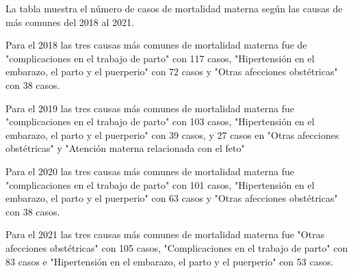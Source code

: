 La tabla muestra el número de casos de mortalidad materna según las causas de más comunes del 2018 al 2021. 

Para el 2018 las tres causas más comunes de mortalidad materna fue de  "complicaciones en el trabajo de parto" con 117 casos, "Hipertensión en el embarazo, el parto y el puerperio" con 72 casos y "Otras afecciones obstétricas" con 38 casos. 

Para el 2019 las tres causas más comunes de mortalidad materna fue "complicaciones en el trabajo de parto" con 103 casos, "Hipertensión en el embarazo, el parto y el puerperio" con 39 casos, y 27 casos en "Otras afecciones obstétricas" y "Atención materna relacionada con el feto"

Para el 2020 las tres causas más comunes de mortalidad materna fue "complicaciones en el trabajo de parto" con 101 casos, "Hipertensión en el embarazo, el parto y el puerperio" con 63 casos y "Otras afecciones obstétricas" con 38 casos. 

Para el 2021 las tres causas más comunes de mortalidad materna fue "Otras afecciones obstétricas" con 105 casos, "Complicaciones en el trabajo de parto" con 83 casos e "Hipertensión en el embarazo, el parto y el puerperio" con 53 casos.